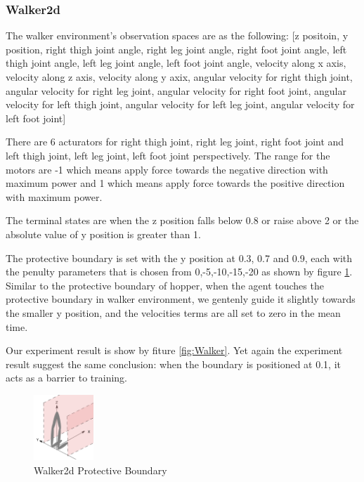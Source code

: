 \documentclass[journal]{IEEEtran}
\begin{document}
\subsubsection{Walker2d}
The walker environment's observation spaces are as the following: [z positoin, y position, right thigh joint angle, right leg joint angle, right foot joint angle, left thigh joint angle, left leg joint angle, left foot joint angle, velocity along x axis, velocity along z axis, velocity along y axix, angular velocity for right thigh joint, angular velocity for right leg joint, angular velocity for right foot joint, angular velocity for left thigh joint, angular velocity for left leg joint, angular velocity for left foot joint]

There are 6 acturators for right thigh joint, right leg joint, right foot joint and left thigh joint, left leg joint, left foot joint perspectively. The range for the motors are -1 which means apply force towards the negative direction with maximum power and 1 which means apply force towards the positive direction with maximum power.

The terminal states are when the z position falls below 0.8 or raise above 2 or the absolute value of y position is greater than 1.

The protective boundary is set with the y position at 0.3, 0.7 and 0.9, each with the penulty parameters that is chosen from 0,-5,-10,-15,-20 as shown by figure \ref{fig:walkerPB}. Similar to the protective boundary of hopper, when the agent touches the protective boundary in walker environment, we gentenly guide it slightly towards the smaller y position, and the velocities terms are all set to zero in the mean time.

Our experiment result is show by fiture \ref{fig:Walker}. Yet again the experiment result suggest the same conclusion: when the boundary is positioned at 0.1, it acts as a barrier to training.

\begin{figure}
     \centering
      \includegraphics[width=0.2\textwidth]{walker.png}
      \caption{Walker2d Protective Boundary}
      \label{fig:walkerPB}
\end{figure}
\end{document}
